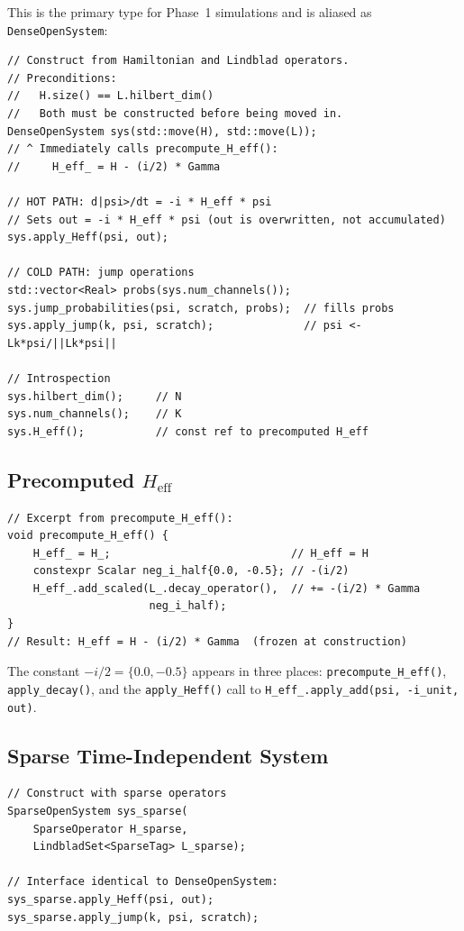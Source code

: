 \documentclass[11pt,a4paper,twoside]{book}
\newcommand{\Heff}{H_{\mathrm{eff}}}
\newcommand{\code}[1]{\texttt{\small#1}}
\theoremstyle{definition}
\theoremstyle{remark}
\begin{document}
This is the primary type for Phase~1 simulations and is aliased
as \code{DenseOpenSystem}:

\begin{verbatim}
// Construct from Hamiltonian and Lindblad operators.
// Preconditions:
//   H.size() == L.hilbert_dim()
//   Both must be constructed before being moved in.
DenseOpenSystem sys(std::move(H), std::move(L));
// ^ Immediately calls precompute_H_eff():
//     H_eff_ = H - (i/2) * Gamma

// HOT PATH: d|psi>/dt = -i * H_eff * psi
// Sets out = -i * H_eff * psi (out is overwritten, not accumulated)
sys.apply_Heff(psi, out);

// COLD PATH: jump operations
std::vector<Real> probs(sys.num_channels());
sys.jump_probabilities(psi, scratch, probs);  // fills probs
sys.apply_jump(k, psi, scratch);              // psi <- Lk*psi/||Lk*psi||

// Introspection
sys.hilbert_dim();     // N
sys.num_channels();    // K
sys.H_eff();           // const ref to precomputed H_eff
\end{verbatim}

\subsection{Precomputed \texorpdfstring{$\Heff$}{Heff}}
\label{subsec:heff-precompute}

\begin{verbatim}
// Excerpt from precompute_H_eff():
void precompute_H_eff() {
    H_eff_ = H_;                            // H_eff = H
    constexpr Scalar neg_i_half{0.0, -0.5}; // -(i/2)
    H_eff_.add_scaled(L_.decay_operator(),  // += -(i/2) * Gamma
                      neg_i_half);
}
// Result: H_eff = H - (i/2) * Gamma  (frozen at construction)
\end{verbatim}

The constant $-i/2 = \{0.0, -0.5\}$ appears in three places:
\code{precompute\_H\_eff()}, \code{apply\_decay()}, and the
\code{apply\_Heff()} call to \code{H\_eff\_.apply\_add(psi, -i\_unit, out)}.

\subsection{Sparse Time-Independent System}
\label{subsec:opensystem-sparse}

\begin{verbatim}
// Construct with sparse operators
SparseOpenSystem sys_sparse(
    SparseOperator H_sparse,
    LindbladSet<SparseTag> L_sparse);

// Interface identical to DenseOpenSystem:
sys_sparse.apply_Heff(psi, out);
sys_sparse.apply_jump(k, psi, scratch);
\end{verbatim}
\end{document}
